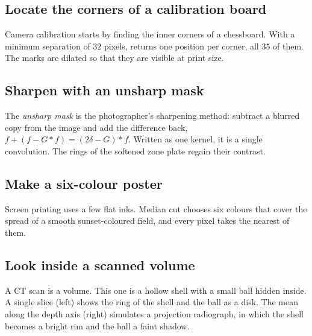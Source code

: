 
\subsection*{Locate the corners of a calibration board}

Camera calibration starts by finding the inner corners of a chessboard. With a
minimum separation of \(32\) pixels,  returns one position per
corner, all \(35\) of them. The marks are dilated so that they are visible at
print size.


\subsection*{Sharpen with an unsharp mask}

The \emph{unsharp mask} is the photographer's sharpening
method: subtract a blurred copy from the image and add the difference back,
\(f + (f - G * f) = (2\delta - G) * f\). Written as one kernel, it is a single
convolution. The rings of the softened zone plate regain their contrast.


\subsection*{Make a six-colour poster}

Screen printing uses a few flat inks. Median cut chooses six colours that cover
the spread of a smooth sunset-coloured field, and every pixel takes the nearest of
them.


\subsection*{Look inside a scanned volume}

A CT scan is a volume. This one is a hollow shell with a small ball hidden
inside. A single slice (left) shows the ring of the shell and the ball as a disk.
The mean along the depth axis (right) simulates a projection radiograph, in which
the shell becomes a bright rim and the ball a faint shadow.


